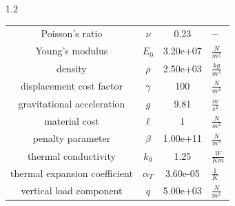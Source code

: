 \documentclass[preview]{standalone}
\begin{document}
\begin{spacing}{1.2}
\begin{tabular}{cccl}
\toprule
Poisson's ratio & $\nu$ & 0.23 & $-$ \\ 
Young's modulus & $E_{0}$ & 3.20e+07 & $\frac{N}{m^2}$ \\ 
density & $\rho$ & 2.50e+03 & $\frac{kg}{m^3}$ \\ 
displacement cost factor & $\gamma$ & 100 & $\frac{N}{m^2}$ \\ 
gravitational acceleration & $g$ & 9.81 & $\frac{m}{s^2}$ \\ 
material cost & $\ell$ & 1 & $\frac{N}{m^2}$ \\ 
penalty parameter & $\beta$ & 1.00e+11 & $\frac{N}{m^3}$ \\ 
thermal conductivity & $k_{0}$ & 1.25 & $\frac{W}{K m}$ \\ 
thermal expansion coefficient & $\alpha_{T}$ & 3.60e-05 & $\frac{1}{K}$ \\ 
vertical load component & $q$ & 5.00e+03 & $\frac{N}{m^2}$ \\ 
\bottomrule
\end{tabular}
\end{spacing}
\end{document}
